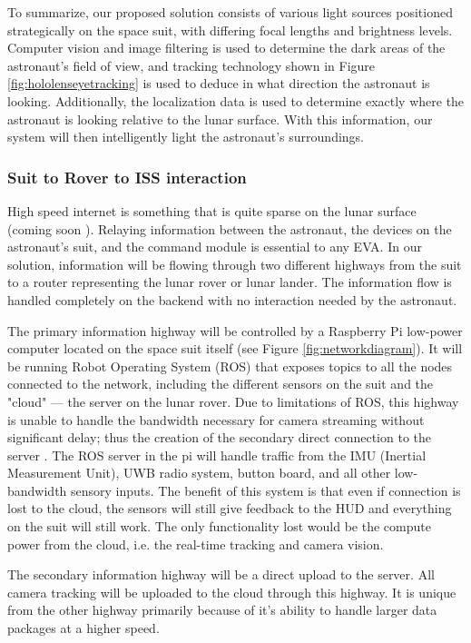 \documentclass{article}
\let\Oldsubsubsection\subsubsection
\renewcommand{\subsubsection}{\FloatBarrier\Oldsubsubsection}
\begin{document}
To summarize, our proposed solution consists of various light sources positioned strategically on the space suit, with differing focal lengths and brightness levels. Computer vision and image filtering is used to determine the dark areas of the astronaut's field of view, and tracking technology shown in Figure \ref{fig:hololenseyetracking} is used to deduce in what direction the astronaut is looking. Additionally, the localization data is used to determine exactly where the astronaut is looking relative to the lunar surface. With this information, our system will then intelligently light the astronaut's surroundings.

\subsubsection{Suit to Rover to ISS interaction}

High speed internet is something that is quite sparse on the lunar surface (coming soon \autocite{mooninternet}). Relaying information between the astronaut, the devices on the astronaut's suit, and the command module is essential to any EVA. In our solution, information will be flowing through two different highways from the suit to a router representing the lunar rover or lunar lander. The information flow is handled completely on the backend with no interaction needed by the astronaut.

The primary information highway will be controlled by a Raspberry Pi low-power computer located on the space suit itself (see Figure \ref{fig:networkdiagram}). It will be running Robot Operating System (ROS) that exposes topics to all the nodes connected to the network, including the different sensors on the suit and the "cloud" --- the server on the lunar rover. Due to limitations of ROS, this highway is unable to handle the bandwidth necessary for camera streaming without significant delay; thus the creation of the secondary direct connection to the server \autocite{dataperformance}. The ROS server in the pi will handle traffic from the IMU (Inertial Measurement Unit), UWB radio system, button board, and all other low-bandwidth sensory inputs. The benefit of this system is that even if connection is lost to the cloud, the sensors will still give feedback to the HUD and everything on the suit will still work. The only functionality lost would be the compute power from the cloud, i.e. the real-time tracking and camera vision.

The secondary information highway will be a direct upload to the server. All camera tracking will be uploaded to the cloud through this highway. It is unique from the other highway primarily because of it's ability to handle larger data packages at a higher speed.
\end{document}
